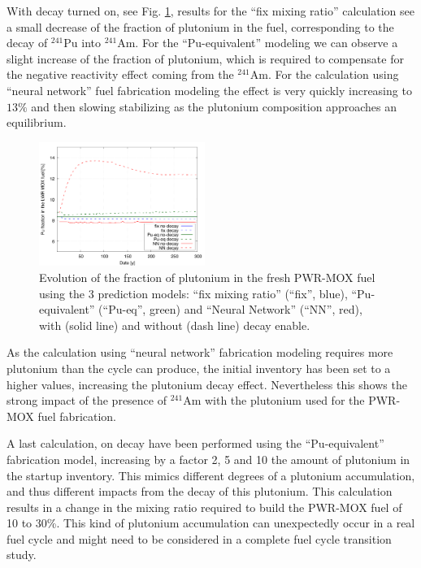 \documentclass{anstrans}
\begin{document}
With decay turned on, see Fig. \ref{fig:d}, results for the ``fix mixing ratio''
calculation see a small decrease of the fraction of plutonium in the fuel,
corresponding to the decay of $^{241}$Pu into $^{241}$Am.  For the
``Pu-equivalent'' modeling we can observe a slight increase of the fraction of
plutonium, which is required to compensate for the negative reactivity effect
coming from the $^{241}$Am. For the calculation using ``neural network'' fuel
fabrication modeling the effect is very quickly increasing to $13\%$ and then
slowing stabilizing as the plutonium composition approaches an equilibrium.

\begin{figure}[h!] %
  \centering
  \includegraphics[width=0.48\textwidth]{decay_pu_contribution.png}
  \caption{Evolution of the fraction of plutonium in the fresh PWR-MOX fuel
    using the 3 prediction models: ``fix mixing ratio'' (``fix'', blue),
    ``Pu-equivalent'' (``Pu-eq'', green) and ``Neural Network'' (``NN'', red),
    with (solid line) and without (dash line) decay enable.} 
  \label{fig:d}
\end{figure}


As the calculation using ``neural network'' fabrication modeling requires more
plutonium than the cycle can produce, the initial inventory has been set to a
higher values, increasing the plutonium decay effect. Nevertheless this shows
the strong impact of the presence of $^{241}$Am with the plutonium used for the
PWR-MOX fuel fabrication.


A last calculation, on decay have been performed using the ``Pu-equivalent''
fabrication model, increasing by a factor 2, 5 and 10 the amount of plutonium in
the startup inventory. This mimics different degrees of a plutonium accumulation,
and thus different impacts from the decay of this plutonium.
This calculation results in a change in the mixing ratio required to build the
PWR-MOX fuel of 10 to 30\%. This kind of plutonium accumulation can
unexpectedly occur in a real fuel cycle and might need to be considered in a
complete fuel cycle transition study.
\end{document}
